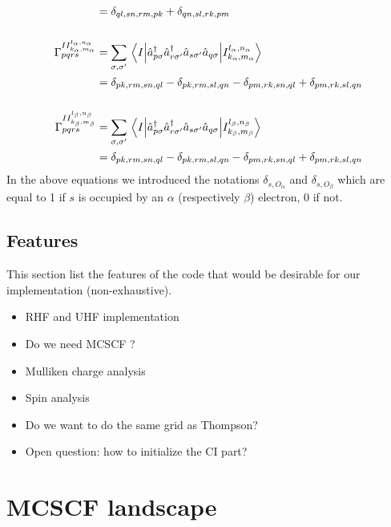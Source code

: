 \documentclass[11pt,a4paper]{article}
\newcommand{\kron}[1]{\delta_{#1}}
\newcommand{\oa}{O_{\alpha}}
\newcommand{\ob}{O_{\beta}}
\begin{document}
\begin{subequations}
\begin{align}
                       &= \kron{ql,sn,rm,pk}+\kron{qn,sl,rk,pm}\notag\\
    \notag \\
    \Gamma_{pqrs}^{II_{k_\alpha,m_\alpha}^{l_\alpha,n_\alpha}} &= \sum_{\sigma,\sigma'}\mel{I}{\hat{a}_{p\sigma}^\dagger\hat{a}_{r\sigma'}^\dagger\hat{a}_{s\sigma'}\hat{a}_{q\sigma}}{I_{k_\alpha,m_\alpha}^{l_\alpha,n_\alpha}} \\
                       &= \kron{pk,rm,sn,ql} - \kron{pk,rm,sl,qn} - \kron{pm,rk,sn,ql} + \kron{pm,rk,sl,qn} \notag\\
    \notag \\
    \Gamma_{pqrs}^{II_{k_\beta,m_\beta}^{l_\beta,n_\beta}} &= \sum_{\sigma,\sigma'}\mel{I}{\hat{a}_{p\sigma}^\dagger\hat{a}_{r\sigma'}^\dagger\hat{a}_{s\sigma'}\hat{a}_{q\sigma}}{I_{k_\beta,m_\beta}^{l_\beta,n_\beta}} \\
    &= \kron{pk,rm,sn,ql} - \kron{pk,rm,sl,qn} - \kron{pm,rk,sn,ql} + \kron{pm,rk,sl,qn} \notag
  \end{align}
\end{subequations}
In the above equations we introduced the notations $\kron{s,\oa}$ and $\kron{s,\ob}$ which are equal to 1 if $s$ is occupied by an $\alpha$ (respectively $\beta$) electron, 0 if not.

\subsection{Features}

This section list the features of the code that would be desirable for our implementation (non-exhaustive).
\begin{itemize}
\item RHF and UHF implementation
\item Do we need MCSCF ?
\item Mulliken charge analysis
\item Spin analysis 
\item Do we want to do the same grid as Thompson?
\item Open question: how to initialize the CI part?
\end{itemize}

\section{MCSCF landscape}
\label{sec:MCSCFland}
\end{document}
